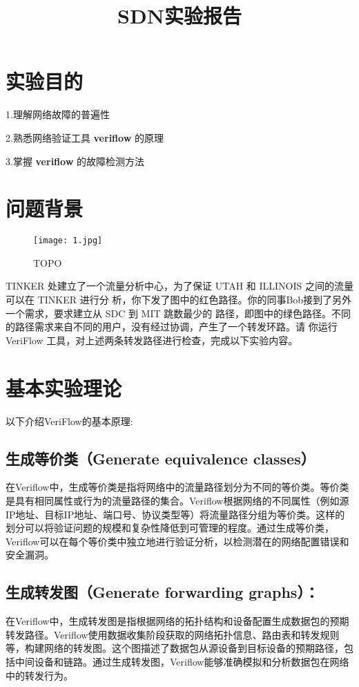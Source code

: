 \documentclass{xjtureport}
\title{SDN实验报告}
\date{\zhtoday}
\begin{document}
\makecover
\makeheader
\tableofcontents
\newpage

\section{实验目的}
1.理解网络故障的普遍性\par 
2.熟悉网络验证工具 \textbf{veriflow} 的原理 \par 
3.掌握 \textbf{veriflow} 的故障检测方法 \par 
\section{问题背景}
\begin{figure}[H]
	\centering
	\texttt{[image: 1.jpg]}
	\caption{TOPO}
\end{figure}
TINKER 处建立了一个流量分析中心，为了保证 UTAH 和 ILLINOIS 之间的流量可以在 TINKER 进行分
析，你下发了图中的红色路径。你的同事Bob接到了另外一个需求，要求建立从 SDC 到 MIT 跳数最少的
路径，即图中的绿色路径。不同的路径需求来自不同的用户，没有经过协调，产生了一个转发环路。请
你运行 VeriFlow 工具，对上述两条转发路径进行检查，完成以下实验内容。
\section{基本实验理论}
以下介绍VeriFlow的基本原理:
\subsection{生成等价类（Generate equivalence classes）}
在Veriflow中，生成等价类是指将网络中的流量路径划分为不同的等价类。等价类是具有相同属性或行为的流量路径的集合。Veriflow根据网络的不同属性（例如源IP地址、目标IP地址、端口号、协议类型等）将流量路径分组为等价类。这样的划分可以将验证问题的规模和复杂性降低到可管理的程度。通过生成等价类，Veriflow可以在每个等价类中独立地进行验证分析，以检测潜在的网络配置错误和安全漏洞。
\subsection{生成转发图（Generate forwarding graphs）：}
在Veriflow中，生成转发图是指根据网络的拓扑结构和设备配置生成数据包的预期转发路径。Veriflow使用数据收集阶段获取的网络拓扑信息、路由表和转发规则等，构建网络的转发图。这个图描述了数据包从源设备到目标设备的预期路径，包括中间设备和链路。通过生成转发图，Veriflow能够准确模拟和分析数据包在网络中的转发行为。
\end{document}
